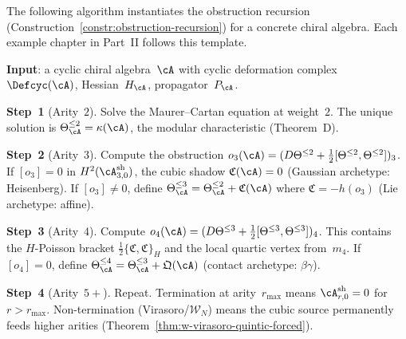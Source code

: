 \begin{construction}
\label{constr:tower-template}
The following algorithm instantiates the obstruction recursion
(Construction~\ref{constr:obstruction-recursion}) for a concrete
chiral algebra.  Each example chapter in Part~II follows this
template.

\smallskip
\noindent\textbf{Input}: a cyclic chiral algebra~$\cA$ with cyclic
deformation complex $\Defcyc(\cA)$, Hessian~$H_{\cA}$,
propagator~$P_{\cA}$.

\smallskip
\noindent\textbf{Step~1} (Arity~$2$).
Solve the Maurer--Cartan equation at weight~$2$.
The unique solution is $\Theta_{\cA}^{\leq 2} = \kappa(\cA)$, the
modular characteristic (Theorem~D).

\smallskip
\noindent\textbf{Step~2} (Arity~$3$).
Compute the obstruction $o_3(\cA) =
(D\Theta^{\leq 2} + \tfrac12[\Theta^{\leq 2},\Theta^{\leq 2}])_3$.
If $[o_3] = 0$ in $H^2(\cA^{\mathrm{sh}}_{3,0})$, the cubic shadow
$\mathfrak{C}(\cA) = 0$ (Gaussian archetype: Heisenberg).
If $[o_3] \neq 0$, define
$\Theta_{\cA}^{\leq 3} = \Theta_{\cA}^{\leq 2}
+ \mathfrak{C}(\cA)$ where $\mathfrak{C} = -h(o_3)$
(Lie archetype: affine).

\smallskip
\noindent\textbf{Step~3} (Arity~$4$).
Compute $o_4(\cA) =
(D\Theta^{\leq 3} + \tfrac12[\Theta^{\leq 3},\Theta^{\leq 3}])_4$.
This contains the $H$-Poisson bracket
$\tfrac12\{\mathfrak{C},\mathfrak{C}\}_{H}$ and the local quartic
vertex from~$m_4$.  If $[o_4] = 0$, define
$\Theta_{\cA}^{\leq 4} = \Theta_{\cA}^{\leq 3}
+ \mathfrak{Q}(\cA)$ (contact archetype: $\beta\gamma$).

\smallskip
\noindent\textbf{Step~4} (Arity~$5{+}$).
Repeat.  Termination at arity~$r_{\max}$ means
$\cA^{\mathrm{sh}}_{r,0} = 0$ for $r > r_{\max}$.
Non-termination (Virasoro/$\mathcal{W}_N$) means the cubic source
permanently feeds higher arities
(Theorem~\ref{thm:w-virasoro-quintic-forced}).
\end{construction}

